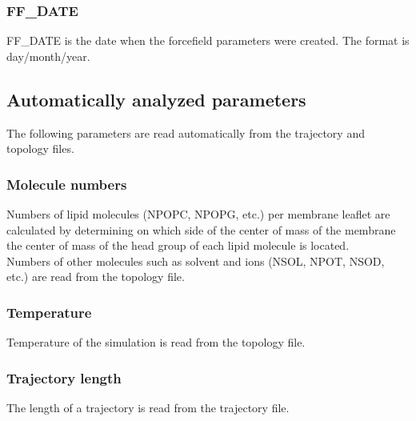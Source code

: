 \documentclass[12pt,a4paper]{article}
\begin{document}
\subsubsection*{FF\_DATE}
FF\_DATE is the date when the forcefield parameters were created. The format is day/month/year.

\subsection*{Automatically analyzed parameters}
The following parameters are read automatically from the trajectory and topology files.

\subsubsection*{Molecule numbers}
Numbers of lipid molecules (NPOPC, NPOPG, etc.) per membrane leaflet are calculated by determining on which side of the center of mass of the membrane the center of mass of the head group of each lipid molecule is located.
\newline \\
\noindent Numbers of other molecules such as solvent and ions (NSOL, NPOT, NSOD, etc.) are read from the topology file.

\subsubsection*{Temperature}
Temperature of the simulation is read from the topology file.

\subsubsection*{Trajectory length}
The length of a trajectory is read from the trajectory file.
\end{document}
